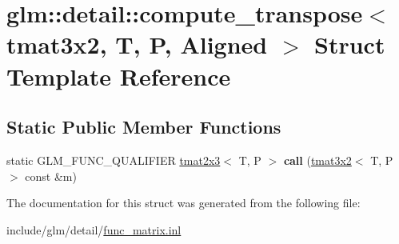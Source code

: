 \hypertarget{structglm_1_1detail_1_1compute__transpose_3_01tmat3x2_00_01T_00_01P_00_01Aligned_01_4}{}\section{glm\+:\+:detail\+:\+:compute\+\_\+transpose$<$ tmat3x2, T, P, Aligned $>$ Struct Template Reference}
\label{structglm_1_1detail_1_1compute__transpose_3_01tmat3x2_00_01T_00_01P_00_01Aligned_01_4}
\subsection*{Static Public Member Functions}
\begin{DoxyCompactItemize}
\item 
\mbox{\label{structglm_1_1detail_1_1compute__transpose_3_01tmat3x2_00_01T_00_01P_00_01Aligned_01_4_a14084c97932d582eb0d6caa2f349d805}} 
static G\+L\+M\+\_\+\+F\+U\+N\+C\+\_\+\+Q\+U\+A\+L\+I\+F\+I\+ER \hyperlink{structglm_1_1tmat2x3}{tmat2x3}$<$ T, P $>$ {\bfseries call} (\hyperlink{structglm_1_1tmat3x2}{tmat3x2}$<$ T, P $>$ const \&m)
\end{DoxyCompactItemize}


The documentation for this struct was generated from the following file\+:\begin{DoxyCompactItemize}
\item 
include/glm/detail/\hyperlink{func__matrix_8inl}{func\+\_\+matrix.\+inl}\end{DoxyCompactItemize}
